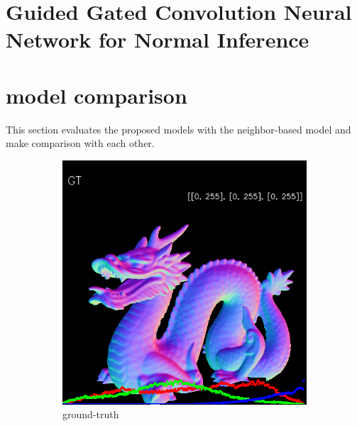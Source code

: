 \section{Guided Gated Convolution Neural Network for Normal Inference }



\newpage 
\section{model comparison}
This section evaluates the proposed models with the neighbor-based model and make comparison with each other.

\begin{figure}[h!]
	\centering
	\begin{subfigure}[b]{0.24\linewidth}
		\includegraphics[width=\linewidth]{./Figures/comparison/fancy_eval_3_groundtruth.png}
		\caption{ground-truth}
	\end{subfigure}
	\begin{subfigure}[b]{0.24\linewidth}

\end{subfigure}
\end{figure}
